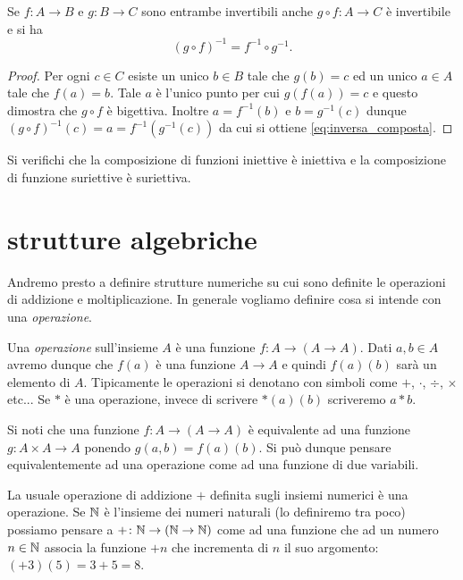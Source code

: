 \begin{theorem}
Se $f\colon A\to B$ e $g\colon B\to C$ sono entrambe invertibili
anche $g\circ f\colon A\to C$ è invertibile e si ha 
\begin{equation}\label{eq:inversa_composta}
  (g\circ f)^{-1} = f^{-1}\circ g^{-1}.
\end{equation}
\end{theorem}
\begin{proof}    
Per ogni $c\in C$ esiste un unico $b\in B$ tale che $g(b)=c$ 
ed un unico $a\in A$ tale che $f(a)=b$. 
Tale $a$ è l'unico punto per cui $g(f(a))=c$ e questo dimostra che 
$g\circ f$ è bigettiva. Inoltre $a=f^{-1}(b)$ e $b=g^{-1}(c)$ 
dunque $(g\circ f)^{-1}(c) = a = f^{-1}(g^{-1}(c))$ da cui si ottiene 
\eqref{eq:inversa_composta}.
\end{proof}

\begin{exercise}
  Si verifichi che la composizione di funzioni iniettive è iniettiva e la composizione 
  di funzione suriettive è suriettiva.
\end{exercise}

\section{strutture algebriche}

Andremo presto a definire strutture numeriche su cui sono definite le operazioni 
di addizione e moltiplicazione. 
In generale vogliamo definire cosa si intende con una \emph{operazione}.
%
%

Una \emph{operazione} sull'insieme $A$ è una funzione 
$f\colon A\to(A\to A)$.
Dati $a,b\in A$ avremo dunque che $f(a)$ è una funzione $A\to A$
e quindi $f(a)(b)$ sarà un elemento di $A$. 
Tipicamente le operazioni si denotano con simboli come $+$, $\cdot$, $\div$, $\times$ etc...
Se $*$ è una operazione, invece di scrivere $*(a)(b)$ scriveremo 
$a*b$.

Si noti che una funzione $f\colon A\to (A\to A)$ è equivalente ad una funzione
$g\colon A\times A \to A$ ponendo $g(a,b) = f(a)(b)$. 
Si può dunque pensare equivalentemente ad una operazione 
come ad una funzione di due variabili.

\begin{example}
La usuale operazione di addizione $+$ definita sugli insiemi numerici è una operazione.
Se ${\mathbb N}$ è l'insieme dei numeri naturali (lo definiremo tra poco)
possiamo pensare a $+\colon {\mathbb N}\to ({\mathbb N}\to {\mathbb N})$ come ad una funzione che ad un 
numero $n\in {\mathbb N}$ associa la funzione $+n$ che incrementa di $n$ il suo argomento:
$(+3)(5)=3+5=8$.
\end{example}

